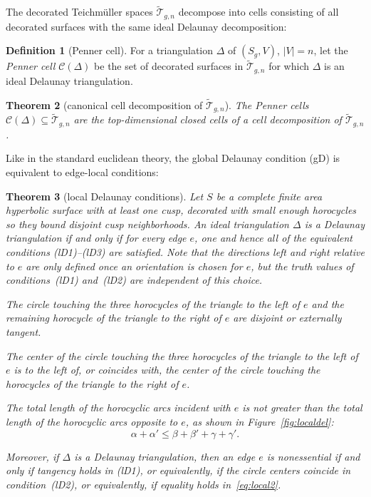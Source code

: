 \documentclass[a4paper, 11pt]{article}
\newcommand{\Teich}{\mathcal{T}}
\newcommand{\decTeich}{\widetilde{\Teich}}
\newcommand{\Tm}{Teich\-m{\"u}l\-ler}
\theoremstyle{plain}
\newtheorem{theorem}{Theorem}[section]
\theoremstyle{definition}
\newtheorem{definition}[theorem]{Definition}
\begin{document}
The decorated \Tm{} spaces $\decTeich_{g,n}$ decompose into cells
consisting of all decorated surfaces with the same ideal Delaunay
decomposition:

\begin{definition}[Penner cell]
  \label{def:pennercell}
  For a triangulation $\Delta$ of $(S_{g},V)$, $|V|=n$, let the
  \emph{Penner cell} $\mathcal{C}(\Delta)$ be the set of decorated
  surfaces in $\decTeich_{g,n}$ for which $\Delta$ is an ideal
  Delaunay triangulation. 
\end{definition}

\begin{theorem}[canonical cell decomposition of $\decTeich_{g,n}$]
  \label{thm:pennerdecomp}
  The Penner cells $\mathcal{C}(\Delta)\subseteq\decTeich_{g,n}$ are
  the top-dimensional closed cells of a cell decomposition of
  $\decTeich_{g,n}$.
\end{theorem}

Like in the standard euclidean theory, the global Delaunay condition
(gD) is equivalent to edge-local conditions:

\begin{theorem}[local Delaunay conditions]
  \label{thm:localdel}
  Let $S$ be a complete finite area hyperbolic surface with at least
  one cusp, decorated with small enough horocycles so they bound
  disjoint cusp neighborhoods. An ideal triangulation $\Delta$ is a
  Delaunay triangulation if and only if for every edge $e$, one and
  hence all of the equivalent conditions (lD1)--(lD3) are satisfied.
  Note that the directions left and right relative to $e$ are only
  defined once an orientation is chosen for $e$, but the truth values
  of conditions~(lD1) and~(lD2) are independent of this choice.
  \begin{compactenum}[(lD1)]
  \item The circle touching the three horocycles of the triangle to
    the left of $e$ and the remaining horocycle of the triangle to the
    right of $e$ are disjoint or externally tangent.
  \item The center of the circle touching the three horocycles of the
    triangle to the left of $e$ is to the left of, or coincides
    with, the center of the circle touching the horocycles of the
    triangle to the right of $e$.
  \item The total length of the horocyclic arcs incident with $e$ is
    not greater than the total length of the horocyclic arcs opposite to
    $e$, as shown in Figure~\ref{fig:localdel}:
  \begin{equation}
    \label{eq:local2}
    \alpha+\alpha'\leq\beta+\beta'+\gamma+\gamma'.
  \end{equation}
  \end{compactenum}
  Moreover, if $\Delta$ is a Delaunay triangulation, then an edge $e$
  is nonessential if and only if tangency holds in (lD1), or
  equivalently, if the circle centers coincide in condition~(lD2), or
  equivalently, if equality holds in~\eqref{eq:local2}.
\end{theorem}
\end{document}
